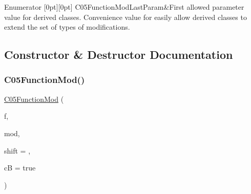\begin{DoxyEnumFields}{Enumerator}
[0pt][0pt]{}\mbox{\label{class_s_m_spp__di__unipi__it_1_1_c05_function_mod_abf764a6c8b2a7afb378f1c4d9897fb97adb81e126000ad16104cf3a4c60fc6e2b}} 
C05\+Function\+Mod\+Last\+Param&First allowed parameter value for derived classes. Convenience value for easily allow derived classes to extend the set of types of modifications. \\
\hline

\end{DoxyEnumFields}


\subsection{Constructor \& Destructor Documentation}
\mbox{\label{class_s_m_spp__di__unipi__it_1_1_c05_function_mod_a1a8a83daf78ff6c3f2a3f7ff378e0112}} 
\subsubsection{\texorpdfstring{C05\+Function\+Mod()}{C05FunctionMod()}}
{\footnotesize\ttfamily \mbox{\hyperlink{class_s_m_spp__di__unipi__it_1_1_c05_function_mod}{C05\+Function\+Mod}} (\begin{DoxyParamCaption}\item[{\mbox{\hyperlink{class_s_m_spp__di__unipi__it_1_1_c05_function}{C05\+Function}} $\ast$const}]{f,  }\item[{const int}]{mod,  }\item[{const \mbox{\hyperlink{class_s_m_spp__di__unipi__it_1_1_function_mod_a44f54e31f9fa8a29194218c234876284}{Function\+Value}}}]{shift = {},  }\item[{const bool}]{cB = {\ttfamily true} }\end{DoxyParamCaption})\hspace{0.3cm}{\ttfamily [inline]}}



